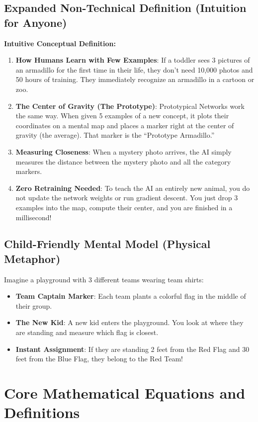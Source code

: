 \documentclass[11pt,a4paper]{article}
\theoremstyle{definition}
\begin{document}
\subsection{Expanded Non-Technical Definition (Intuition for Anyone)}
\textbf{Intuitive Conceptual Definition:}
\begin{enumerate}
    \item \textbf{How Humans Learn with Few Examples}: If a toddler sees 3 pictures of an armadillo for the first time in their life, they don't need 10,000 photos and 50 hours of training. They immediately recognize an armadillo in a cartoon or zoo.
    \item \textbf{The Center of Gravity (The Prototype)}: Prototypical Networks work the same way. When given 5 examples of a new concept, it plots their coordinates on a mental map and places a marker right at the center of gravity (the average). That marker is the ``Prototype Armadillo.''
    \item \textbf{Measuring Closeness}: When a mystery photo arrives, the AI simply measures the distance between the mystery photo and all the category markers.
    \item \textbf{Zero Retraining Needed}: To teach the AI an entirely new animal, you do not update the network weights or run gradient descent. You just drop 3 examples into the map, compute their center, and you are finished in a millisecond!
\end{enumerate}

\subsection{Child-Friendly Mental Model (Physical Metaphor)}
Imagine a playground with 3 different teams wearing team shirts:
\begin{itemize}
    \item \textbf{Team Captain Marker}: Each team plants a colorful flag in the middle of their group.
    \item \textbf{The New Kid}: A new kid enters the playground. You look at where they are standing and measure which flag is closest.
    \item \textbf{Instant Assignment}: If they are standing 2 feet from the Red Flag and 30 feet from the Blue Flag, they belong to the Red Team!
\end{itemize}

\section{Core Mathematical Equations and Definitions}
\end{document}
